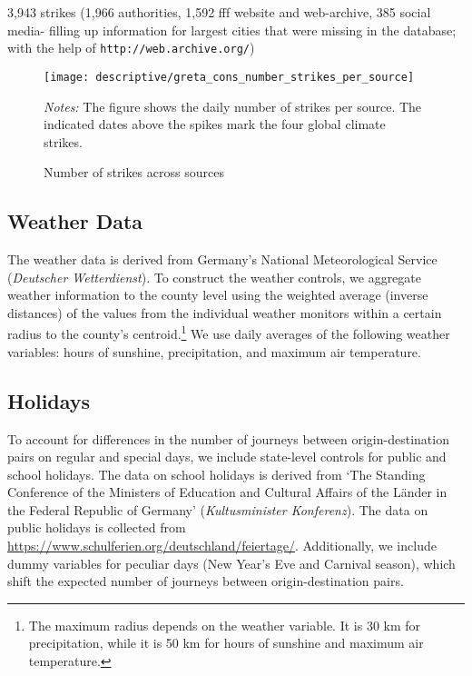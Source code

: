3,943 strikes (1,966 authorities, 1,592 fff website and web-archive, 385 social media- filling up information for largest cities that were missing in the database; with the help of \texttt{http://web.archive.org/})

\begin{figure}[H]\centering
	\caption{Number of strikes across sources}\label{fig_greta_cons:number_strikes_per_source}
	\texttt{[image: descriptive/greta\_cons\_number\_strikes\_per\_source]}
	\begin{minipage}{0.8\linewidth}
		\scriptsize{\emph{Notes:} The figure shows the daily number of strikes per source. The indicated dates above the spikes mark the four global climate strikes.}
	\end{minipage}
\end{figure}



\subsection{Weather Data}
The weather data is derived from Germany's National Meteorological Service (\textit{Deutscher Wetterdienst}). To construct the weather controls, we aggregate weather information to the county level using the weighted average (inverse distances) of the values from the individual weather monitors within a certain radius to the county's centroid.\footnote{The maximum radius depends on the weather variable. It is 30 km for precipitation, while it is 50 km for hours of sunshine and maximum air temperature.} We use daily averages of the following weather variables: hours of sunshine, precipitation, and maximum air temperature.   



\subsection{Holidays}
To account for differences in the number of journeys between origin-destination pairs on regular and special days, we include state-level controls for public and school holidays. The data on school holidays is derived from `The Standing Conference of the Ministers of Education and Cultural Affairs of the Länder in the Federal Republic of Germany' (\textit{Kultusminister Konferenz}). The data on public holidays is collected from \url{https://www.schulferien.org/deutschland/feiertage/}. Additionally, we include dummy variables for peculiar days (New Year's Eve and Carnival season), which shift the expected number of journeys between origin-destination pairs.







